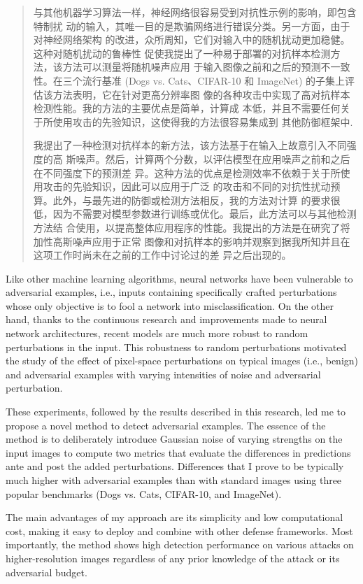\begin{abstract}
	\large
	与其他机器学习算法一样，神经网络很容易受到对抗性示例的影响，即包含特制扰
	动的输入，其唯一目的是欺骗网络进行错误分类。另一方面，由于对神经网络架构
	的改进，众所周知，它们对输入中的随机扰动更加稳健。这种对随机扰动的鲁棒性
	促使我提出了一种易于部署的对抗样本检测方法，该方法可以测量将随机噪声应用
	于输入图像之前和之后的预测不一致性。在三个流行基准 (Dogs vs.
	Cats、CIFAR-10 和 ImageNet) 的子集上评估该方法表明，它在针对更高分辨率图
	像的各种攻击中实现了高对抗样本检测性能。我的方法的主要优点是简单，计算成
	本低，并且不需要任何关于所使用攻击的先验知识，这使得我的方法很容易集成到
	其他防御框架中.

	我提出了一种检测对抗样本的新方法，该方法基于在输入上故意引入不同强度的高
	斯噪声。然后，计算两个分数，以评估模型在应用噪声之前和之后在不同强度下的预测差
	异。这种方法的优点是检测效率不依赖于关于所使用攻击的先验知识，因此可以应用于广泛
	的攻击和不同的对抗性扰动预算。此外，与最先进的防御或检测方法相反，我的方法对计算
	的要求很低，因为不需要对模型参数进行训练或优化。最后，此方法可以与其他检测方法结
	合使用，以提高整体应用程序的性能。我提出的方法是在研究了将加性高斯噪声应用于正常
	图像和对抗样本的影响并观察到据我所知并且在这项工作时尚未在之前的工作中讨论过的差
	异之后出现的。
\end{abstract}
\afterpage{\blankpage}

\begin{enabstract}
	\large
	Like other machine learning algorithms, neural networks have been vulnerable
	to adversarial examples, i.e., inputs containing specifically crafted
	perturbations whose only objective is to fool a network into
	misclassification. On the other hand, thanks to the continuous research and
	improvements made to neural network architectures, recent models are much
	more robust to random perturbations in the input. This robustness to random
	perturbations motivated the study of the effect of pixel-space perturbations
	on typical images (i.e., benign) and adversarial examples with varying
	intensities of noise and adversarial perturbation.

	These experiments, followed by the results described in this research, led
	me to propose a novel method to detect adversarial examples. The essence of
	the method is to deliberately introduce Gaussian noise of varying strengths
	on the input images to compute two metrics that evaluate the differences in
	predictions ante and post the added perturbations. Differences that I prove
	to be typically much higher with adversarial examples than with standard
	images using three popular benchmarks (Dogs vs. Cats, CIFAR-10, and
	ImageNet).

	The main advantages of my approach are its simplicity and low computational
	cost, making it easy to deploy and combine with other defense frameworks.
	Most importantly, the method shows high detection performance on various
	attacks on higher-resolution images regardless of any prior knowledge of the
	attack or its adversarial budget.
\end{enabstract}
\afterpage{\blankpage}
